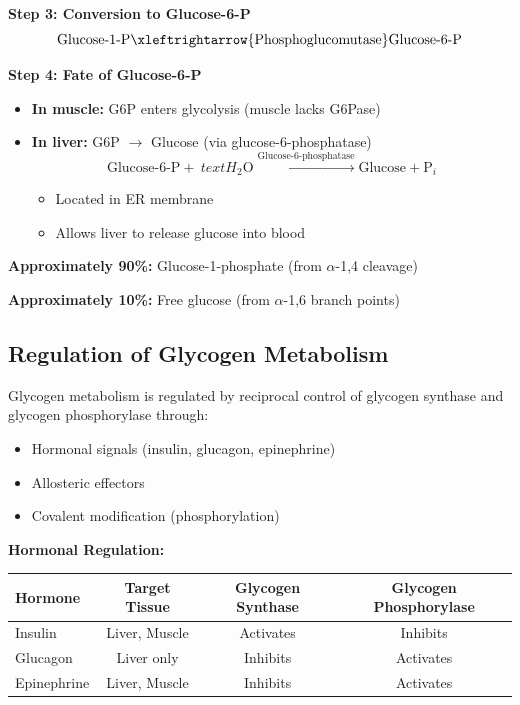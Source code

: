 \textbf{Step 3: Conversion to Glucose-6-P}
\[
\text{Glucose-1-P} \xleftrightarrow{\text{Phosphoglucomutase}} \text{Glucose-6-P}
\]

\textbf{Step 4: Fate of Glucose-6-P}

\begin{itemize}
    \item \textbf{In muscle:} G6P enters glycolysis (muscle lacks G6Pase)
    \item \textbf{In liver:} G6P $\rightarrow$ Glucose (via glucose-6-phosphatase)
    \[
    \text{Glucose-6-P} + \
text{H}_2\text{O} \xrightarrow{\text{Glucose-6-phosphatase}} \text{Glucose} + \text{P}_i
    \]
    \begin{itemize}
        \item Located in ER membrane
        \item Allows liver to release glucose into blood
    \end{itemize}
\end{itemize}

\begin{tcolorbox}[colback=yellow!10, colframe=yellow!70!black, title=\textbf{Glycogenolysis Products}]
\textbf{Approximately 90\%:} Glucose-1-phosphate (from $\alpha$-1,4 cleavage)

\textbf{Approximately 10\%:} Free glucose (from $\alpha$-1,6 branch points)
\end{tcolorbox}

\subsection{Regulation of Glycogen Metabolism}

Glycogen metabolism is regulated by reciprocal control of glycogen synthase and glycogen phosphorylase through:
\begin{itemize}
    \item Hormonal signals (insulin, glucagon, epinephrine)
    \item Allosteric effectors
    \item Covalent modification (phosphorylation)
\end{itemize}

\textbf{Hormonal Regulation:}

\begin{center}
\begin{tabular}{lccc}
\toprule
\textbf{Hormone} & \textbf{Target Tissue} & \textbf{Glycogen Synthase} & \textbf{Glycogen Phosphorylase} \\
\midrule
Insulin & Liver, Muscle & Activates & Inhibits \\
Glucagon & Liver only & Inhibits & Activates \\
Epinephrine & Liver, Muscle & Inhibits & Activates \\
\bottomrule
\end{tabular}
\end{center}

